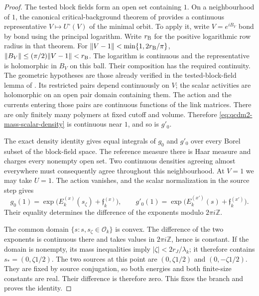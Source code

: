 \documentclass[11pt,letterpaper,reqno]{amsart}
\theoremstyle{definition}
\theoremstyle{remark}
\begin{document}
\begin{proof}
The tested block fields form an open set containing \(1\).
On a neighbourhood of \(1\), the canonical critical-background
theorem of \cite[Thm. E]{YMM1} provides a continuous representative
\(V\mapsto U^\circ(V)\) of the minimal orbit. To apply it,
write \(V=e^{iB_V}\) bond by bond using the principal logarithm.
Write $r_{\rm B}$ for the positive logarithmic row radius
in that theorem. For \(\|V-1\|<\min\{1,2r_{\rm B}/\pi\}\),
\(\|B_V\|\le(\pi/2)\|V-1\|<r_{\rm B}\).
The logarithm is continuous and the representative is
holomorphic in \(B_V\) on this ball. Their composition has
the required continuity. The geometric hypotheses are those
already verified in the tested-block-field lemma of \cite{QCDM1}.
Its restricted pairs depend continuously
on \(V\); the scalar activities are holomorphic on an open
pair domain containing them. The action and the currents
entering those pairs are continuous functions of the link
matrices. There are only finitely many polymers at fixed
cutoff and volume. Therefore \eqref{eq:qcdm2-mass-scalar-density}
is continuous near \(1\), and so is \(g'_0\).

The exact density identity gives equal integrals of \(g_0\)
and \(g'_0\) over every Borel subset of the block-field space.
The reference measure there is Haar measure and charges every
nonempty open set. Two continuous densities agreeing almost
everywhere must consequently agree throughout this neighbourhood.
At \(V=1\) we may take \(U=1\). The action vanishes, and the
scalar normalization in the source step gives
\[
 g_0(1)=\exp\bigl(E_k^{(x)}(s_\zeta)+\mathfrak f_k^{(x)}\bigr),
 \qquad
 g'_0(1)=\exp\bigl(E_k^{(x')}(s)+\mathfrak f_k^{(x')}\bigr).
\]
Their equality determines the difference of the exponents
modulo \(2\pi i\mathbb Z\).

The common domain
\(\{s:s,s_\zeta\in\mathscr O_k\}\) is convex.
The difference of the two exponents is continuous there and
takes values in \(2\pi i\mathbb Z\), hence is constant.
If the domain is nonempty, its mass inequalities imply
\(|\zeta|<2r_J/\lambda_k\); it therefore contains
\(s_*=(0,\zeta1/2)\). The two sources at this point are
\((0,\zeta1/2)\) and \((0,-\zeta1/2)\).
They are fixed by source conjugation, so both energies and
both finite-size constants are real. Their difference is
therefore zero. This fixes the branch and proves the identity.
\end{proof}
\end{document}
